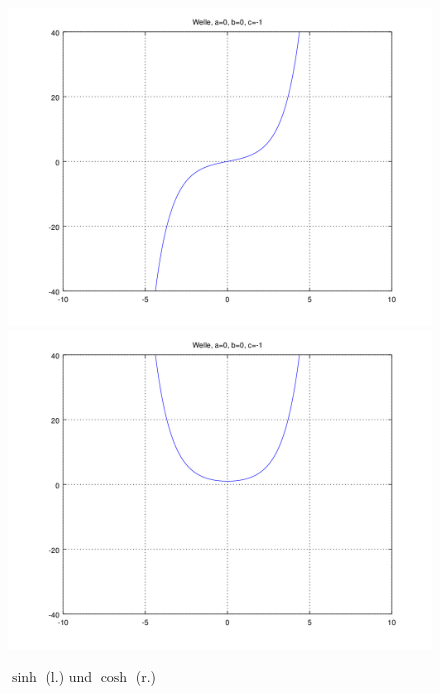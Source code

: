\begin{figure}
	\includegraphics[scale=0.35]{./wellen/images/basicfunctions/sinh.png}
	\includegraphics[scale=0.35]{./wellen/images/basicfunctions/cosh.png}
	\caption{$\sinh$ (l.) und $\cosh$ (r.)}
	\label{fig:wellen:sinh-cosh}
\end{figure}